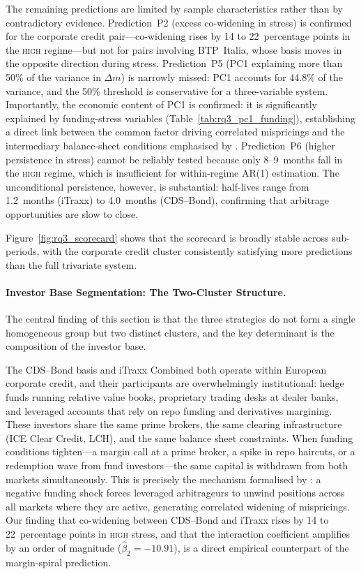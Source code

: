 The remaining predictions are limited by sample characteristics rather than
by contradictory evidence.  Prediction~P2 (excess co-widening in stress) is
confirmed for the corporate credit pair---co-widening rises by 14 to
22~percentage points in the \textsc{high} regime---but not for pairs
involving BTP~Italia, whose basis moves in the opposite direction during
stress.  Prediction~P5 (PC1 explaining more than 50\% of the variance in
$\Delta m$) is narrowly missed: PC1 accounts for 44.8\% of the variance,
and the 50\% threshold is conservative for a three-variable system.
Importantly, the economic content of PC1 is confirmed: it is significantly
explained by funding-stress variables (Table~\ref{tab:rq3_pc1_funding}),
establishing a direct link between the common factor driving correlated
mispricings and the intermediary balance-sheet conditions emphasised by
\citet{he2017intermediary}.  Prediction~P6 (higher persistence in stress)
cannot be reliably tested because only 8--9~months fall in the \textsc{high}
regime, which is insufficient for within-regime AR(1) estimation.  The
unconditional persistence, however, is substantial: half-lives range from
1.2~months (iTraxx) to 4.0~months (CDS--Bond), confirming that arbitrage
opportunities are slow to close.

Figure~\ref{fig:rq3_scorecard} shows that the scorecard is broadly stable
across sub-periods, with the corporate credit cluster consistently
satisfying more predictions than the full trivariate system.

\paragraph{Investor Base Segmentation: The Two-Cluster Structure.}
The central finding of this section is that the three strategies do not form a
single homogeneous group but two distinct clusters, and the key determinant is
the composition of the investor base.

The CDS--Bond basis and iTraxx Combined both operate within European corporate
credit, and their participants are overwhelmingly institutional: hedge funds
running relative value books, proprietary trading desks at dealer banks, and
leveraged accounts that rely on repo funding and derivatives margining.  These
investors share the same prime brokers, the same clearing infrastructure (ICE
Clear Credit, LCH), and the same balance sheet constraints.  When funding
conditions tighten---a margin call at a prime broker, a spike in repo haircuts,
or a redemption wave from fund investors---the same capital is withdrawn from
both markets simultaneously.  This is precisely the mechanism formalised by
\citet{BrunnermeierPedersen2009}: a negative funding shock forces leveraged
arbitrageurs to unwind positions across all markets where they are active,
generating correlated widening of mispricings.  Our finding that co-widening
between CDS--Bond and iTraxx rises by 14 to 22~percentage points in
\textsc{high} stress, and that the interaction coefficient amplifies by an order
of magnitude ($\hat{\beta}_{2} = -10.91$), is a direct empirical counterpart of
the margin-spiral prediction.

